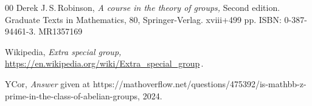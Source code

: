 \documentclass{amsart}
\numberwithin{equation}{section}
\numberwithin{theorem}{section}
\begin{document}
\begin{thebibliography}{00}
 Derek J.\,S.\,Robinson,
{\em A course in the theory of groups,} Second edition.
Graduate Texts in Mathematics, 80, Springer-Verlag.
xviii+499 pp. ISBN: 0-387-94461-3.
MR1357169


 Wikipedia,
{\em Extra special group,}
\url{https://en.wikipedia.org/wiki/Extra_special_group}\,.

 YCor, {\em Answer} given at https://mathoverflow.net/questions/475392/is-mathbb-z-prime-in-the-class-of-abelian-groups, 2024.

\end{thebibliography}
\end{document}
